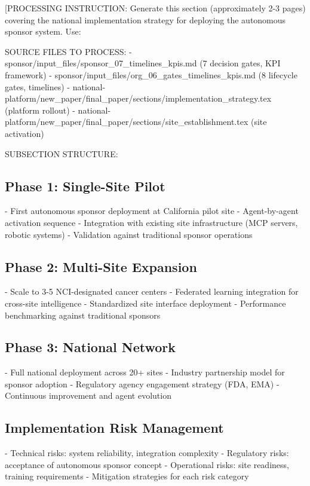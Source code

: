 
[PROCESSING INSTRUCTION: Generate this section (approximately 2-3 pages) covering the
national implementation strategy for deploying the autonomous sponsor system. Use:

SOURCE FILES TO PROCESS:
- sponsor/input\_files/sponsor\_07\_timelines\_kpis.md (7 decision gates, KPI framework)
- sponsor/input\_files/org\_06\_gates\_timelines\_kpis.md (8 lifecycle gates, timelines)
- national-platform/new\_paper/final\_paper/sections/implementation\_strategy.tex (platform rollout)
- national-platform/new\_paper/final\_paper/sections/site\_establishment.tex (site activation)

SUBSECTION STRUCTURE:

\subsection{Phase 1: Single-Site Pilot}
- First autonomous sponsor deployment at California pilot site
- Agent-by-agent activation sequence
- Integration with existing site infrastructure (MCP servers, robotic systems)
- Validation against traditional sponsor operations

\subsection{Phase 2: Multi-Site Expansion}
- Scale to 3-5 NCI-designated cancer centers
- Federated learning integration for cross-site intelligence
- Standardized site interface deployment
- Performance benchmarking against traditional sponsors

\subsection{Phase 3: National Network}
- Full national deployment across 20+ sites
- Industry partnership model for sponsor adoption
- Regulatory agency engagement strategy (FDA, EMA)
- Continuous improvement and agent evolution

\subsection{Implementation Risk Management}
- Technical risks: system reliability, integration complexity
- Regulatory risks: acceptance of autonomous sponsor concept
- Operational risks: site readiness, training requirements
- Mitigation strategies for each risk category

